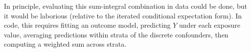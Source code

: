 \documentclass[12pt]{article}
\numberwithin{equation}{section}
\begin{document}
In principle, evaluating this sum-integral combination in data could be done, but it would be laborious (relative to the iterated conditional expectation form). In code, this requires fitting an outcome model, predicting $Y$ under each exposure value, averaging predictions within strata of the discrete confounders, then computing a weighted sum across strata. %

\end{document}
